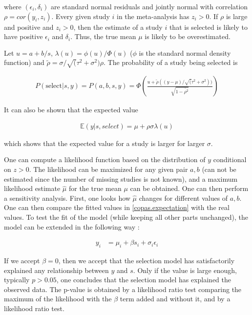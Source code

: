 \documentclass[11pt,a4paper,twoside]{book}\usepackage[]{graphicx}\usepackage[]{color}
\begin{document}
where $(\epsilon_{i}, \delta_{i})$ are standard normal residuals and jointly normal with correlation $\rho = cor(y_{i}, z_{i})$. Every given study $i$ in the meta-analysis has $z_{i} > 0$. If $\rho$ is large and positive and $z_{i} > 0$, then the estimate of a study $i$ that is selected is likely to have positive $\epsilon_{i}$ and $\delta_{i}$. Thus, the true mean $\mu$ is likely to be overestimated. 

\vspace{0mm}
Let $u = a + b/s$, $\lambda(u) = \phi(u)/\Phi(u)$ ($\phi$ is the standard normal density function) and $\tilde{\rho} = \sigma/\sqrt(\tau^2 + \sigma^2) \rho$. The probability of a study being selected is

\begin{align}
P(\textrm{select}|s, y) = P(a,b,s,y) = \Phi(\frac{u + \tilde{\rho}((y - \mu)/\sqrt(\tau^2 + \sigma^2))}{\sqrt{1 - \tilde{\rho^2}}})
\end{align}

It can also be shown that the expected value 

\begin{align}
\mathbb{E}(y|s, select) = \mu + \rho\sigma\lambda(u) \label{copas.expectation}
\end{align}

which shows that the expected value for a study is larger for larger $\sigma$. 

\vspace{0mm}
One can compute a likelihood function based on the distribution of $y$ conditional on $z > 0$. The likelihood can be maximized for any given pair $a,b$ (can not be estimated since the number of missing studies is not known), and a maximum likelihood estimate $\hat{\mu}$ for the true mean $\mu$ can be obtained. One can then perform a sensitivity analysis. First, one looks how $\hat{\mu}$ changes for different values of $a,b$. One can then compare the fitted values in \ref{copas.expectation} with the real values. To test the fit of the model (while keeping all other parts unchanged), the model can be extended in the following way :

\begin{align}
y_{i} &= \mu_{i} + \beta s_{i} + \sigma_{i}\epsilon_{i}
\end{align}

If we accept $\beta = 0$, then we accept that the selection model has satisfactorily explained any relationship between $y$ and $s$. Only if the value is large enough, typically $p > 0.05$, one concludes that the selection model has explained the observed data. The p-value is obtained by a likelihood ratio test comparing the maximum of the likelihood with the $\beta$ term added and without it, and by a likelihood ratio test.
\end{document}
